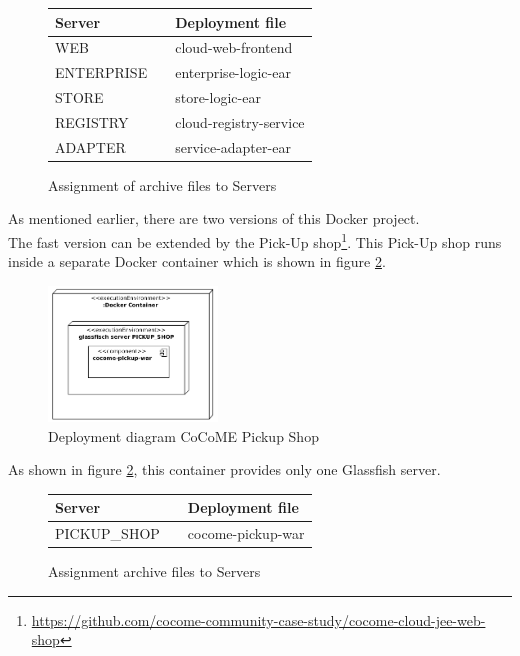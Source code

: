  	\begin{figure}[H]
 		\centering
 		\begin{tabular}{p{}|p{}p{}}
 			Server && Deployment file \\
 			\hline
 			WEB && cloud-web-frontend  \\
 			ENTERPRISE && enterprise-logic-ear  \\
 			STORE && store-logic-ear  \\
 			REGISTRY && cloud-registry-service  \\
 			ADAPTER && service-adapter-ear \\	
 		\end{tabular}
 		\caption{Assignment of archive files to Servers}
 		\label{table_assignment}
 	\end{figure}
 \noindent
    As mentioned earlier, there are two versions of this Docker project.\\
 	 The fast version can be extended by the Pick-Up shop\footnote{\url{https://github.com/cocome-community-case-study/cocome-cloud-jee-web-shop}}. This Pick-Up shop runs inside a separate Docker container which is shown in figure \ref{Deploym_Pickup}.  
 	\begin{figure}[h]
 		\centering
 		\includegraphics[width = 0.4\textwidth]{img/docker_Container_PickUP.png}
 		\caption{Deployment diagram CoCoME Pickup Shop}
 		\label{Deploym_Pickup}
 	\end{figure}
 	As shown in figure \ref*{Deploym_Pickup}, this container provides only one Glassfish server.
 	\begin{figure}[H]
 		\centering
 		\begin{tabular}{p{}|p{}p{}}
 			Server && Deployment file \\
 			\hline
 			PICKUP\_SHOP && cocome-pickup-war \\	
 		\end{tabular}
 		\caption{Assignment archive files to Servers}
 		\label{table_assignment_pickup}
 	\end{figure}
